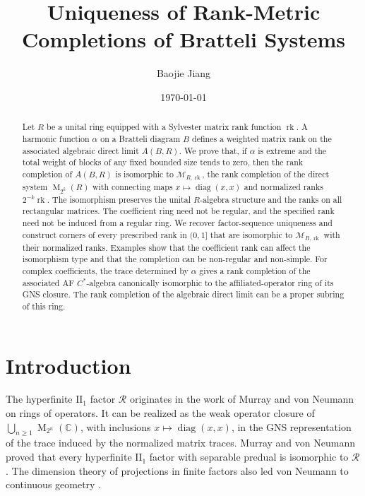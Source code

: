 \documentclass[11pt]{amsart}
\title{Uniqueness of Rank-Metric Completions of Bratteli Systems}
\author{Baojie Jiang}
\date{\today}
\DeclareMathOperator{\rk}{rk}
\DeclareMathOperator{\Mat}{M}
\DeclareMathOperator{\diag}{diag}
\theoremstyle{definition}
\theoremstyle{remark}
\begin{document}
\allowdisplaybreaks
\raggedbottom

\begin{abstract}
Let $R$ be a unital ring equipped with a Sylvester matrix rank function
$\rk$.  A harmonic function $\alpha$ on a Bratteli diagram $B$
defines a weighted matrix rank on the associated algebraic direct limit
$A(B,R)$.
We prove that, if $\alpha$ is extreme and the total weight of blocks
of any fixed bounded size tends to zero, then the rank completion of
$A(B,R)$ is isomorphic to $\mathcal M_{R,\rk}$, the rank completion
of the direct system $\Mat_{2^k}(R)$ with connecting maps
$x\mapsto\diag(x,x)$ and normalized ranks $2^{-k}\rk$.
The isomorphism preserves the unital $R$-algebra structure and the
ranks on all rectangular matrices.
The coefficient ring need not be regular, and the specified rank
need not be induced from a regular ring.
We recover factor-sequence uniqueness and construct corners of every
prescribed rank in $(0,1]$ that are isomorphic to $\mathcal M_{R,\rk}$
with their normalized ranks.
Examples show that the coefficient rank can affect the isomorphism
type and that the completion can be non-regular and non-simple.
For complex coefficients, the trace determined by $\alpha$ gives a
rank completion of the associated AF $C^*$-algebra canonically
isomorphic to the affiliated-operator ring of its GNS closure.
The rank completion of the algebraic direct limit can be a proper
subring of this ring.
\end{abstract}

\maketitle
\enlargethispage{2pt}

\section{Introduction}

The hyperfinite $\mathrm{II}_1$ factor $\mathcal R$ originates in
the work of Murray and von Neumann
\cite{MurrayVonNeumann1936,MurrayVonNeumann1943} on rings of operators.
It can be realized as the weak operator closure of
$\bigcup_{n\geq1}\Mat_{2^n}(\mathbb C)$, with inclusions
$x\mapsto
\diag(x,x)$, in the GNS representation of the trace
induced by the normalized matrix traces.
Murray and von Neumann \cite{MurrayVonNeumann1943} proved that every
hyperfinite $\mathrm{II}_1$ factor with separable predual is isomorphic
to $\mathcal R$.
The dimension theory of projections in finite factors also led von
Neumann to continuous geometry \cite{vonNeumann1936Geometry}.
\end{document}
